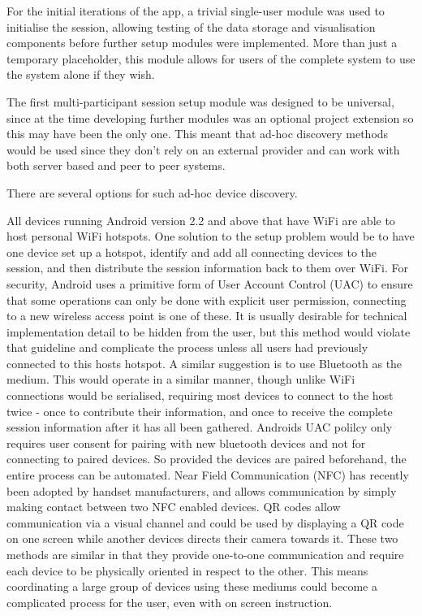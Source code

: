 For the initial iterations of the app, a trivial single-user module was used to initialise the session, allowing testing of the data storage and visualisation components before further setup modules were implemented. More than just a temporary placeholder, this module allows for users of the complete system to use the system alone if they wish.

The first multi-participant session setup module was designed to be universal, since at the time developing further modules was an optional project extension so this may have been the only one.
This meant that ad-hoc discovery methods would be used since they don't rely on an external provider and can work with both server based and peer to peer systems.

There are several options for such ad-hoc device discovery.

All devices running Android version 2.2 and above that have WiFi are able to host personal WiFi hotspots. One solution to the setup problem would be to have one device set up a hotspot, identify and add all connecting devices to the session, and then distribute the session information back to them over WiFi. For security, Android uses a primitive form of User Account Control (UAC) to ensure that some operations can only be done with explicit user permission, connecting to a new wireless access point is one of these. It is usually desirable for technical implementation detail to be hidden from the user, but this method would violate that guideline and complicate the process unless all users had previously connected to this hosts hotspot.
A similar suggestion is to use Bluetooth as the medium. This would operate in a similar manner, though unlike WiFi connections would be serialised, requiring most devices to connect to the host twice - once to contribute their information, and once to receive the complete session information after it has all been gathered. Androids UAC polilcy only requires user consent for pairing with new bluetooth devices and not for connecting to paired devices. So provided the devices are paired beforehand, the entire process can be automated.
Near Field Communication (NFC) has recently been adopted by handset manufacturers, and allows communication by simply making contact between two NFC enabled devices. QR codes allow communication via a visual channel and could be used by displaying a QR code on one screen while another devices directs their camera towards it. These two methods are similar in that they provide one-to-one communication and require each device to be physically oriented in respect to the other. This means coordinating a large group of devices using these mediums could become a complicated process for the user, even with on screen instruction.

